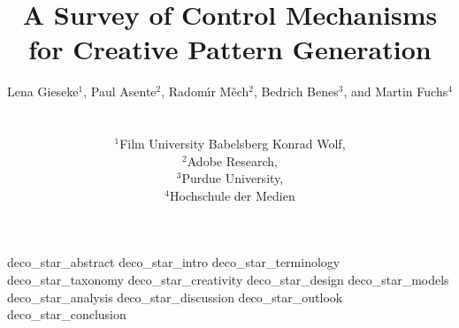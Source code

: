 \documentclass{egpubl}
\title[A Survey of Control Mechanisms for Creative Pattern Generation]%
      {A Survey of Control Mechanisms for Creative Pattern Generation}
\author[L. Gieseke, P. Asente, R. Mech, B. Benes, M. Fuchs]
{\parbox{\textwidth}{\centering Lena Gieseke$^{1}$, Paul Asente$^{2}$, Radom\'{\i}r M\v{e}ch$^{2}$, Bedrich Benes$^{3}$, and Martin Fuchs$^{4}$}
        \\
{\parbox{\textwidth}{\centering $^1$Film University Babelsberg Konrad Wolf,\\
         $^2$Adobe Research,\\
         $^3$Purdue University,\\
         $^4$Hochschule der Medien
       }
}
}
\begin{document}

\maketitle

{deco_star_abstract}
{deco_star_intro}
{deco_star_terminology}
{deco_star_taxonomy}
{deco_star_creativity}
{deco_star_design}
{deco_star_models}
{deco_star_analysis}
{deco_star_discussion}
{deco_star_outlook}
{deco_star_conclusion}


%  
%        




\printbibliography
\end{document}
